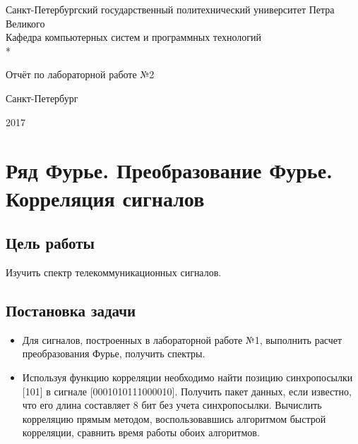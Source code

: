 \documentclass[12pt,a4paper]{article}
\begin{document}
\begin{titlepage}
	\newpage
	
	\begin{center}
		Санкт-Петербургский государственный политехнический 
		университет Петра Великого \\
		\vspace{1cm}
		Кафедра компьютерных систем и программных технологий\\*
	\end{center}
	
	\vspace{8em}
	
	\begin{center}
		 Отчёт по лабораторной работе №2
	\end{center}
	
	\vspace{2.5em}

	\vspace{6em}

	\vspace{\fill}
	
	\begin{center}
		Санкт-Петербург
		
		 2017
	\end{center}
	
\end{titlepage}

\newpage


\tableofcontents


\section{Ряд Фурье. Преобразование Фурье. Корреляция сигналов}

\subsection{Цель работы}

Изучить спектр телекоммуникационных сигналов.

\subsection{Постановка задачи}

\begin{itemize}
\item Для сигналов, построенных в лабораторной работе №1, выполнить расчет преобразования Фурье, получить спектры.
\item Используя функцию корреляции необходимо найти позицию синхропосылки [101] в сигнале [0001010111000010]. Получить пакет данных, если известно, что его длина составляет 8 бит без учета синхропосылки. Вычислить корреляцию прямым методом, воспользовавшись алгоритмом быстрой корреляции, сравнить время работы обоих алгоритмов.
\end{itemize}
\end{document}
